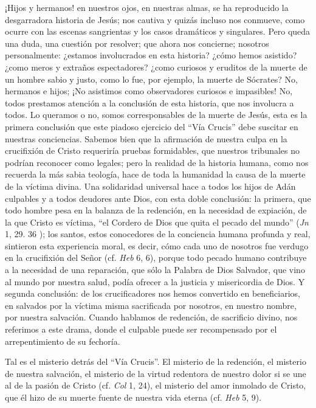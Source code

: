 			\begin{body}¡Hijos y hermanos! en nuestros ojos, en nuestras almas, se ha reproducido la desgarradora historia de Jesús; nos cautiva y quizás incluso nos conmueve, como ocurre con las escenas sangrientas y los casos dramáticos y singulares. Pero queda una duda, una cuestión por resolver; que ahora nos concierne; nosotros personalmente: ¿estamos involucrados en esta historia? ¿cómo hemos asistido? ¿como meros y extraños espectadores? ¿como curiosos y eruditos de la muerte de un hombre sabio y justo, como lo fue, por ejemplo, la muerte de Sócrates? No, hermanos e hijos; ¡No asistimos como observadores curiosos e impasibles! No, todos prestamos atención a la conclusión de esta historia, que nos involucra a todos. Lo queramos o no, somos corresponsables de la muerte de Jesús, esta es la primera conclusión que este piadoso ejercicio del “Vía Crucis” debe suscitar en nuestras conciencias. Sabemos bien que la afirmación de nuestra culpa en la crucifixión de Cristo requeriría pruebas formidables, que nuestros tribunales no podrían reconocer como legales; pero la realidad de la historia humana, como nos recuerda la más sabia teología, hace de toda la humanidad la causa de la muerte de la víctima divina. Una solidaridad universal hace a todos los hijos de Adán culpables y a todos deudores ante Dios, con esta doble conclusión: la primera, que todo hombre pesa en la balanza de la redención, en la necesidad de expiación, de la que Cristo es víctima, “el Cordero de Dios que quita el pecado del mundo” (\textit{Jn} 1, 29. 36 ); los santos, estos conocedores de la conciencia humana profunda y real, sintieron esta experiencia moral, es decir, cómo cada uno de nosotros fue verdugo en la crucifixión del Señor (cf. \textit{Heb }6, 6), porque todo pecado humano contribuye a la necesidad de una reparación, que sólo la Palabra de Dios Salvador, que vino al mundo por nuestra salud, podía ofrecer a la justicia y misericordia de Dios. Y segunda conclusión: de los crucificadores nos hemos convertido en beneficiarios, en salvados por la víctima misma sacrificada por nosotros, en nuestro nombre, por nuestra salvación. Cuando hablamos de redención, de sacrificio divino, nos referimos a este drama, donde el culpable puede ser recompensado por el arrepentimiento de su fechoría.\end{body}
			
			\begin{body}Tal es el misterio detrás del “Vía Crucis”. El misterio de la redención, el misterio de nuestra salvación, el misterio de la virtud redentora de nuestro dolor si se une al de la pasión de Cristo (cf. \textit{Col }1, 24), el misterio del amor inmolado de Cristo, que él hizo de su muerte fuente de nuestra vida eterna (cf. \textit{Heb} 5, 9).\end{body}
			
